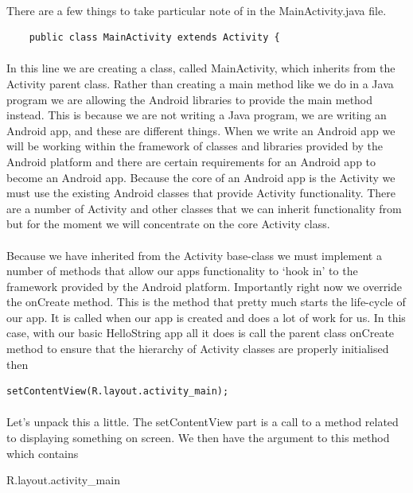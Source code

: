 \documentclass[12pt, a4paper, twoside]{book}
\begin{document}
\paragraph{} There are a few things to take particular note of in the MainActivity.java file.

\begin{lstlisting}
    public class MainActivity extends Activity {
\end{lstlisting}

\paragraph{} In this line we are creating a class, called MainActivity, which inherits from the Activity parent class. Rather than creating a main method like we do in a Java program we are allowing the Android libraries to provide the main method instead. This is because we are not writing a Java program, we are writing an Android app, and these are different things. When we write an Android app we will be working within the framework of classes and libraries provided by the Android platform and there are certain requirements for an Android app to become an Android app. Because the core of an Android app is the Activity we must use the existing Android classes that provide Activity functionality. There are a number of Activity and other classes that we can inherit functionality from but for the moment we will concentrate on the core Activity class.

\paragraph{} Because we have inherited from the Activity base-class we must implement a number of methods that allow our apps functionality to `hook in' to the framework provided by the Android platform. Importantly right now we override the onCreate method. This is the method that pretty much starts the life-cycle of our app. It is called when our app is created and does a lot of work for us. In this case, with our basic HelloString app all it does is call the parent class onCreate method to ensure that the hierarchy of Activity classes are properly initialised then

\begin{lstlisting}
setContentView(R.layout.activity_main);
\end{lstlisting}

\paragraph{} Let's unpack this a little. The setContentView part is a call to a method related to displaying something on screen. We then have the argument to this method which contains 
\begin{framed}
R.layout.activity\_main
\end{framed}
\end{document}
